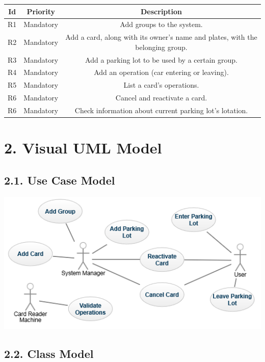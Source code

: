 \documentclass[12pt]{report}
\begin{document}
\begin{longtable}{|c|c|c|}
\hline
\textbf{Id} & \textbf{Priority} & \textbf{Description} \\
\hline
R1 & Mandatory & Add groups to the system.\\
\hline
R2 & Mandatory & Add a card, along with its owner's name and plates, with the belonging group.\\
\hline
R3 & Mandatory & Add a parking lot to be used by a certain group.\\
\hline
R4 & Mandatory & Add an operation (car entering or leaving). \\
\hline
R5 & Mandatory & List a card's operations.\\
\hline
R6 & Mandatory & Cancel and reactivate a card. \\
\hline
R6 & Mandatory & Check information about current parking lot's lotation. \\
\hline
\end{longtable}

\newpage

\section*{2. Visual UML Model}
\subsection*{2.1. Use Case Model}

\includegraphics{use-case-model}

\subsection*{2.2. Class Model}
\end{document}
